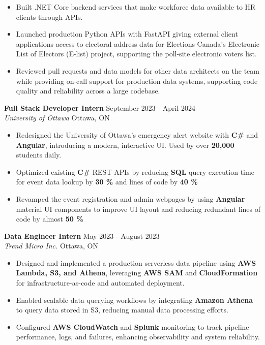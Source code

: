 \documentclass[a4paper]{article}
\begin{document}
\begin{itemize}
\item Built .NET Core backend services that make workforce data available to HR clients through APIs.

\item Launched production Python APIs with FastAPI giving external client applications access to electoral address data for Elections Canada's Electronic List of Electors (E-list) project, supporting the poll-site electronic voters list.

\item Reviewed pull requests and data models for other data architects on the team while providing on-call support for production data systems, supporting code quality and reliability across a large codebase.

\end{itemize}

\textbf{Full Stack Developer Intern } \hfill September 2023 - April 2024\\
\textit{University of Ottawa} \hfill Ottawa, ON\\
\vspace{-2mm}
\begin{itemize} \itemsep -4pt
    \item Redesigned the University of Ottawa's emergency alert website with \textbf{C\#} and \textbf{Angular}, introducing a modern, interactive UI. Used by over \textbf{20,000} students daily.
     \item Optimized existing \textbf{C\#} REST APIs by reducing \textbf{SQL} query execution time for event data lookup by \textbf{30 \%} and lines of code by \textbf{40 \%}
    \item Revamped the event registration and admin webpages by using \textbf{Angular} material UI components to improve UI layout and reducing redundant lines of code by almost \textbf{50 \%}
\end{itemize}

\textbf{Data Engineer Intern} \hfill May 2023 - August 2023\\
\textit{Trend Micro Inc.} \hfill Ottawa, ON\\
\vspace{-2mm}
\begin{itemize} \itemsep -4pt

\item Designed and implemented a production serverless data pipeline using \textbf{AWS Lambda, S3, and Athena}, leveraging \textbf{AWS SAM} and \textbf{CloudFormation} for infrastructure-as-code and automated deployment.

\item Enabled scalable data querying workflows by integrating \textbf{Amazon Athena} to query data stored in S3, reducing manual data processing efforts.

\item Configured \textbf{AWS CloudWatch} and \textbf{Splunk} monitoring to track pipeline performance, logs, and failures, enhancing observability and system reliability.

\end{itemize}
\end{document}
